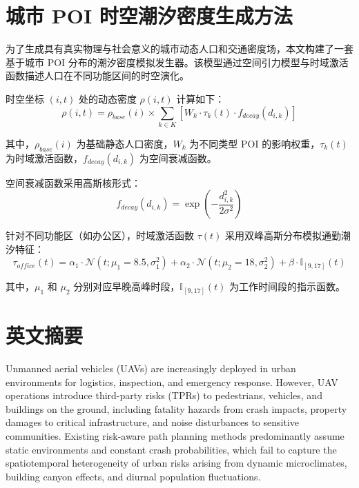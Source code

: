 \appendix
\section{城市 POI 时空潮汐密度生成方法}
\label{appendix:poi_model}

为了生成具有真实物理与社会意义的城市动态人口和交通密度场，本文构建了一套基于城市 POI 分布的潮汐密度模拟发生器。该模型通过空间引力模型与时域激活函数描述人口在不同功能区间的时空演化。

时空坐标 $(i, t)$ 处的动态密度 $\rho(i, t)$ 计算如下：
\begin{equation}
\rho(i, t) = \rho_{base}(i) \times \sum_{k \in K} \left[ W_k \cdot \tau_k(t) \cdot f_{decay}(d_{i,k}) \right]
\label{eq:appendix_dynamic_density}
\end{equation}

其中，$\rho_{base}(i)$ 为基础静态人口密度，$W_k$ 为不同类型 POI 的影响权重，$\tau_k(t)$ 为时域激活函数，$f_{decay}(d_{i,k})$ 为空间衰减函数。

空间衰减函数采用高斯核形式：
\begin{equation}
f_{decay}(d_{i,k}) = \exp\left(-\frac{d_{i,k}^2}{2\sigma^2}\right)
\label{eq:appendix_spatial_decay}
\end{equation}

针对不同功能区（如办公区），时域激活函数 $\tau(t)$ 采用双峰高斯分布模拟通勤潮汐特征：
\begin{equation}
\tau_{office}(t) = \alpha_1 \cdot \mathcal{N}(t; \mu_1=8.5, \sigma_1^2) + \alpha_2 \cdot \mathcal{N}(t; \mu_2=18, \sigma_2^2) + \beta \cdot \mathbb{I}_{[9,17]}(t)
\label{eq:appendix_office_activation}
\end{equation}

其中，$\mu_1$ 和 $\mu_2$ 分别对应早晚高峰时段，$\mathbb{I}_{[9,17]}(t)$ 为工作时间段的指示函数。

\section{英文摘要}
Unmanned aerial vehicles (UAVs) are increasingly deployed in urban environments for logistics, inspection, and emergency response. However, UAV operations introduce third-party risks (TPRs) to pedestrians, vehicles, and buildings on the ground, including fatality hazards from crash impacts, property damages to critical infrastructure, and noise disturbances to sensitive communities. Existing risk-aware path planning methods predominantly assume static environments and constant crash probabilities, which fail to capture the spatiotemporal heterogeneity of urban risks arising from dynamic microclimates, building canyon effects, and diurnal population fluctuations.

